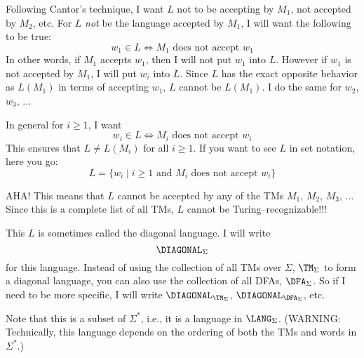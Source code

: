 Following Cantor's technique,
I want $L$ not to be accepting by $M_1$,
not accepted by $M_2$, etc.
For $L$ \textit{not} be the language
accepted by $M_1$, I will want the following to be true:
\[
w_1 \in L \iff M_1 \text{ does not accept }  w_1
\]
In other words, if $M_1$ accepts $w_1$, then I will not put $w_1$ into $L$.
However if $w_1$ is not accepted by $M_1$, I will put $w_i$ into $L$.
Since $L$ has the exact 
opposite behavior as $L(M_1)$ in terms of accepting $w_1$,
$L$ cannot be $L(M_1)$.
I do the same for $w_2$, $w_3$, ...

In general for $i \geq 1$, I want
\[
w_i \in L \iff M_i \text{ does not accept }  w_i
\]
This ensures that $L \neq L(M_i)$ for all $i \geq 1$.
If you want to see $L$ in set notation, here you go:
\[
L = \{ w_i \mid i \geq 1 \text{ and } M_i \text{ does not accept } w_i \}
\]

AHA!
This means that $L$ cannot be accepted by any of the TMs
$M_1$, $M_2$, $M_3$, ...
Since this is a complete list of all TMs,
$L$ cannot be Turing--recognizable!!!

This $L$ is sometimes called the diagonal language.
I will write
\[
\DIAGONAL_\Sigma
\]
for this language.
Instead of using the collection of all TMs over $\Sigma$, $\TM_{\Sigma}$
to form a
diagonal language, you can also use the collection of all
DFAs, $\DFA_{\Sigma}$. So if I need to be more specific, I will write
$\DIAGONAL_{\TM_{\Sigma}}$,
$\DIAGONAL_{\DFA_{\Sigma}}$, etc.

Note that this is a subset of $\Sigma^*$, i.e., 
it is a language in $\LANG_\Sigma$.
(WARNING: Technically, this 
language depends on the ordering of both the TMs and 
words in $\Sigma^*$.)


\begin{comment}
(Note:
The above simply gives a pairing between $\TM$ and $\Sigma^*$:
\begin{align*}
\TM \times \Sigma^* &\rightarrow \{0,1\} \\
\langle M, w \rangle &=
\begin{cases}
1 & \text{ if $M$ accepts $w$} \\ 
0 & \text{ otherwise} \\ 
\end{cases}
\end{align*}
Composing with $\N$ (using any encoding of TMs and $\Sigma^*$, we get
\begin{align*}
\N \rightarrow \TM \times \Sigma^* &\rightarrow \{0,1\} \\
i \mapsto \langle M_i, w_i \rangle &=
\begin{cases}
1 & \text{ if $M$ accepts $w$} \\ 
0 & \text{ otherwise} \\ 
\end{cases}
\end{align*}
\end{comment}
